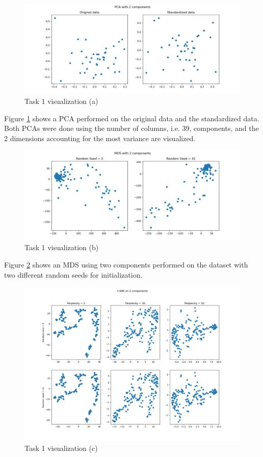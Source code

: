 \documentclass[11pt,a4paper,titlepage]{article}
\begin{document}
\begin{figure}[h]
    \centering
    \includegraphics[width=1.0\linewidth]{reports/assignment-4/imgs/pca.png}
    \caption{Task 1 visualization (a)}
    \label{fig:pca}
\end{figure}

Figure \ref{fig:pca} shows a PCA performed on the original data and the standardized data. Both PCAs were done using the number of columns, i.e. 39, components, and the 2 dimensions accounting for the most variance are visualized.

\begin{figure}[h]
    \centering
    \includegraphics[width=1.0\linewidth]{reports/assignment-4/imgs/mds.png}
    \caption{Task 1 visualization (b)}
    \label{fig:mds}
\end{figure}

\newpage

Figure \ref{fig:mds} shows an MDS using two components performed on the dataset with two different random seeds for initialization.

\begin{figure}[h]
    \centering
    \includegraphics[width=1.0\linewidth]{reports/assignment-4/imgs/tsne.png}
    \caption{Task 1 visualization (c)}
    \label{fig:tsne}
\end{figure}
\end{document}
